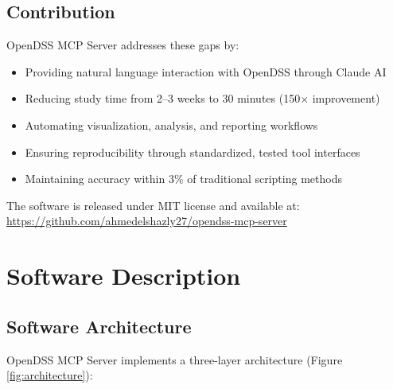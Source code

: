 \documentclass[review]{elsarticle}
\begin{document}
\subsection{Contribution}

OpenDSS MCP Server addresses these gaps by:
\begin{itemize}
    \item Providing natural language interaction with OpenDSS through Claude AI
    \item Reducing study time from 2--3 weeks to 30 minutes (150× improvement)
    \item Automating visualization, analysis, and reporting workflows
    \item Ensuring reproducibility through standardized, tested tool interfaces
    \item Maintaining accuracy within 3\% of traditional scripting methods
\end{itemize}

The software is released under MIT license and available at: \url{https://github.com/ahmedelshazly27/opendss-mcp-server}

\section{Software Description}
\label{sec:description}

\subsection{Software Architecture}

OpenDSS MCP Server implements a three-layer architecture (Figure \ref{fig:architecture}):
\end{document}

